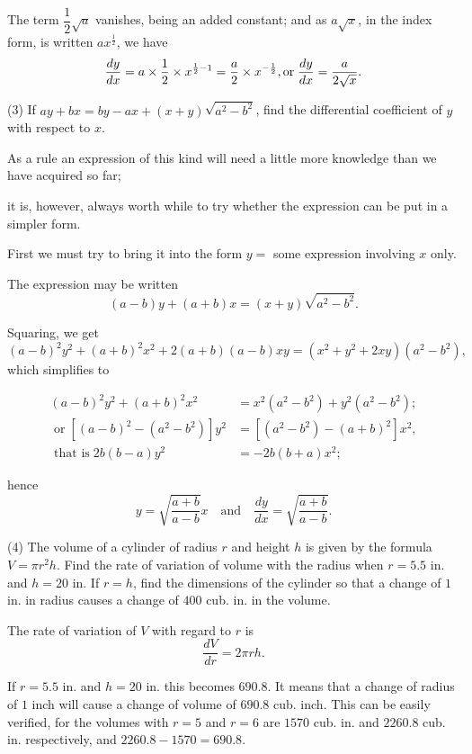 \documentclass{ximera}
\begin{document}
{{{The term $\dfrac{1}{2}\sqrt{a}$ vanishes, being an added constant;
and as $a\sqrt{x}$, in the index form, is written $ax^{\frac{1}{2}}$, we
have
\[
\frac{dy}{dx}
  = a \times \frac{1}{2} \times x^{\frac{1}{2}-1}
  =     \frac{a}{2} \times x^{-\frac{1}{2}}, \\
 \text{or}\;
\frac{dy}{dx} = \frac{a}{2\sqrt{x}}.
\]

(3) If $ay + bx = by - ax + (x+y)\sqrt{a^2 - b^2}$,
find the differential coefficient of $y$ with respect to $x$.

As a rule an expression of this kind will need a
little more knowledge than we have acquired so far;

it is, however, always worth while to try whether the
expression can be put in a simpler form.

First we must try to bring it into the form $y = {}$ some
expression involving $x$ only.

The expression may be written
\[
(a-b)y + (a + b)x = (x+y) \sqrt{a^2 - b^2}.
\]

Squaring, we get
\[
(a-b)^2 y^2 + (a + b)^2 x^2 + 2(a+b)(a-b)xy = (x^2+y^2+2xy)(a^2-b^2),
\]
which simplifies to

\begin{align*}
(a-b)^2y^2 + (a+b)^2 x^2 &= x^2(a^2 - b^2) + y^2(a^2 - b^2); \\
\text{ or}\;
[(a-b)^2 - (a^2 - b^2)]y^2 &= [(a^2 - b^2) - (a+b)^2]x^2, \\
\text{ that is}\;
2b(b-a)y^2 &= -2b(b+a)x^2;
\end{align*}

 hence
 \[
y = \sqrt{\frac{a+b}{a-b}} x \quad\text{and}\quad \frac{dy}{dx} = \sqrt{\frac{a+b}{a-b}}.
\]

(4) The volume of a cylinder of radius $r$ and height $h$
is given by the formula $V = \pi r^2 h$. Find the rate of
variation of volume with the radius when $r = 5.5$ in.
and $h=20$ in. If $r = h$, find the dimensions of the
cylinder so that a change of $1$ in. in radius causes a
change of $400$ cub. in. in the volume.

The rate of variation of $V$ with regard to $r$ is
\[
\frac{dV}{dr} = 2 \pi r h.
\]

If $r = 5.5$ in. and $h=20$ in. this becomes $690.8$. It
means that a change of radius of $1$ inch will cause a
change of volume of $690.8$ cub. inch. This can be
easily verified, for the volumes with $r = 5$ and $r = 6$
are $1570$ cub. in. and $2260.8$ cub. in. respectively, and
$2260.8 - 1570 = 690.8$.

}}}
\end{document}
